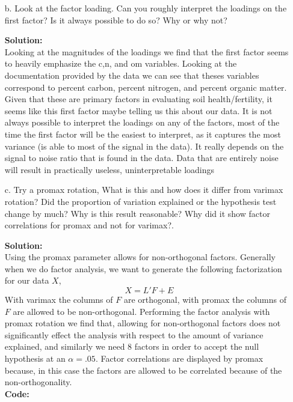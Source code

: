 \documentclass[12pt]{article}
\makeatletter
\theoremstyle{homework}
\newenvironment{exercise}[1]
{\def\@currentlabel{#1}\exercisecore}
{\endexercisecore}
\newcommand{\localhead}[1]{\par\smallskip\noindent\textbf{#1}\nobreak\\}%
\newcommand\solution{\localhead{Solution:}}
\makeatother
\begin{document}
\begin{exercise}{1}
\begin{enumerate}
    \vspace{.15in}



    \item[b.] Look at the factor loading. Can you roughly interpret the loadings on the first factor? Is it always possible to do so? Why or why not?\\
    \solution Looking at the magnitudes of the loadings we find that the first factor seems to heavily emphasize the c,n, and om variables. Looking at the documentation provided by the 
    data we can see that theses variables correspond to percent carbon, percent nitrogen, and percent organic matter. Given that these are primary factors in evaluating soil health/fertility, it seems like 
    this first factor maybe telling us this about our data. It is not always possible to interpret the loadings on any of the factors, most of the time the first factor will be the easiest to interpret, as it 
    captures the most variance (is able to most of the signal in the data). It really depends on the signal to noise ratio that is found in the data. Data that are entirely noise will result in practically useless, uninterpretable loadings
    \vspace{.15in}  

    \item[c.] Try a promax rotation, What is this and how does it differ from varimax rotation? Did the proportion of variation explained or the hypothesis test 
    change by much? Why is this result reasonable? Why did it show factor correlations for promax and not for varimax?. \\
    \solution Using the promax parameter allows for non-orthogonal factors. Generally when we do factor analysis, we want to generate the following factorization for our data $X$, 
    \begin{equation*}
      X = L'F+E
    \end{equation*}
    With varimax the columns of $F$ are orthogonal, with promax the columns of $F$ are allowed to be non-orthogonal. Performing the factor analysis with promax rotation we find that, allowing for non-orthogonal factors does not significantly effect 
    the analysis with respect to the amount of variance explained, and similarly we need 8 factors in order to accept the null hypothesis at an $\alpha = .05$. Factor correlations are displayed by promax because, in this case the factors are allowed to be correlated because 
    of the non-orthogonality.\\
    \textbf{Code:}
    \begin{center}
    
    \end{center}
    \vspace{.15in}



\end{enumerate}
\end{exercise}
\end{document}
